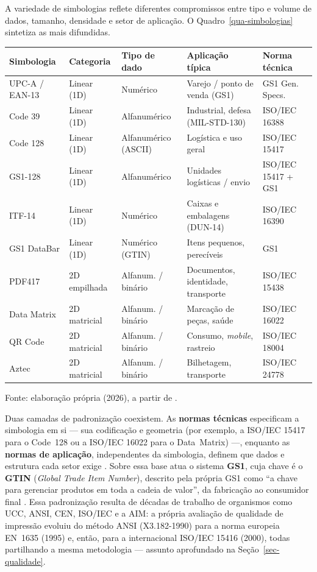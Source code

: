 \documentclass[
	article,			%
	11pt,				%
	oneside,			%
	a4paper,			%
	english,			%
	brazilian,			%
	sumario=tradicional
	]{abntex2}
\begin{document}
A variedade de simbologias reflete diferentes compromissos entre tipo e volume de
dados, tamanho, densidade e setor de aplicação. O Quadro~\ref{qua-simbologias}
sintetiza as mais difundidas.

\begin{quadro}[htb]
\centering
\caption{Principais simbologias de código de barras}
\label{qua-simbologias}
\begin{tabular}{@{}p{2.5cm}p{1.6cm}p{2.1cm}p{3.5cm}p{2.0cm}@{}}
\toprule
\textbf{Simbologia} & \textbf{Categoria} & \textbf{Tipo de dado} & \textbf{Aplicação típica} & \textbf{Norma técnica}\\
\midrule
UPC-A / EAN-13 & Linear (1D) & Numérico & Varejo / ponto de venda (GS1) & GS1 Gen. Specs.\\
Code 39 & Linear (1D) & Alfanumérico & Industrial, defesa (MIL-STD-130) & ISO/IEC 16388\\
Code 128 & Linear (1D) & Alfanumérico (ASCII) & Logística e uso geral & ISO/IEC 15417\\
GS1-128 & Linear (1D) & Alfanumérico & Unidades logísticas / envio & ISO/IEC 15417 + GS1\\
ITF-14 & Linear (1D) & Numérico & Caixas e embalagens (DUN-14) & ISO/IEC 16390\\
GS1 DataBar & Linear (1D) & Numérico (GTIN) & Itens pequenos, perecíveis & GS1\\
PDF417 & 2D empilhada & Alfanum. / binário & Documentos, identidade, transporte & ISO/IEC 15438\\
Data Matrix & 2D matricial & Alfanum. / binário & Marcação de peças, saúde & ISO/IEC 16022\\
QR Code & 2D matricial & Alfanum. / binário & Consumo, \textit{mobile}, rastreio & ISO/IEC 18004\\
Aztec & 2D matricial & Alfanum. / binário & Bilhetagem, transporte & ISO/IEC 24778\\
\bottomrule
\end{tabular}

\vspace{2pt}
{\footnotesize Fonte: elaboração própria (2026), a partir de .}
\end{quadro}

Duas camadas de padronização coexistem. As \textbf{normas técnicas} especificam a
simbologia em si --- sua codificação e geometria (por exemplo, a ISO/IEC 15417 para
o Code~128 ou a ISO/IEC 16022 para o Data~Matrix) ---, enquanto as \textbf{normas de
aplicação}, independentes da simbologia, definem que dados e estrutura cada setor
exige \cite{seagull}. Sobre essa base atua o sistema \textbf{GS1}, cuja chave é o
\textbf{GTIN} (\textit{Global Trade Item Number}), descrito pela própria GS1 como
``a chave para gerenciar produtos em toda a cadeia de valor'', da fabricação ao
consumidor final \cite{gs1br}. Essa padronização resulta de décadas de trabalho de
organismos como UCC, ANSI, CEN, ISO/IEC e a AIM: a própria avaliação de qualidade
de impressão evoluiu do método ANSI (X3.182-1990) para a norma europeia EN~1635
(1995) e, então, para a internacional ISO/IEC 15416 (2000), todas partilhando a
mesma metodologia \cite{aim_layman} --- assunto aprofundado na
Seção~\ref{sec-qualidade}.
\end{document}
